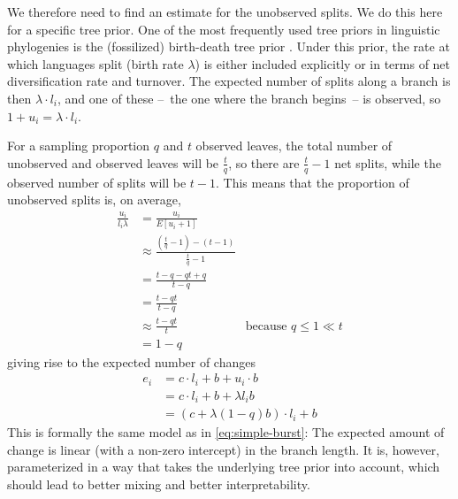 \documentclass[]{rsos}%
\begin{document}
We therefore need to find an estimate for the unobserved splits.
We do this here for a specific tree prior.
One of the most frequently used tree priors in linguistic phylogenies
is the (fossilized) birth-death tree prior \parencite{gernhard2008conditioned,stadler2010samplingthroughtime,heath2014fossilized,rama2018three}.
Under this prior, the rate at which
languages split (birth rate $\lambda$) is either included explicitly or in terms of net diversification rate and turnover.
The expected number of splits along a branch is then $\lambda \cdot l_i$, and one of these –~the one where the branch begins~– is observed, so $1 + u_i = \lambda \cdot l_i$.

For a sampling proportion $q$ and $t$ observed leaves, the total number of unobserved and observed leaves will be
$\frac{t}{q}$, so there are $\frac{t}{q} - 1$ net splits,
while the observed number of splits will be $t - 1$. This means that the proportion of unobserved splits is, on average,
\begin{align}
  \frac{u_i}{l_i \lambda}
  &= \frac{u_i}{E[u_i + 1]} \\
  & \approx \frac{(\frac{t}{q} - 1) - (t - 1)}{\frac{t}{q} -1} \\
  & = \frac{t - q - qt + q}{t - q} \\
  & = \frac{t - qt}{t - q} \\
  & \approx \frac{t - qt}{t} &\text{because } q \leq 1 \ll t \\
  & = 1 - q
\end{align}
giving rise to the expected number of changes
\begin{align}
  e_i &= c \cdot l_i + b + u_i \cdot b  \\
  &= c \cdot l_i + b + \lambda l_i b \\
  &= (c + \lambda (1-q) b) \cdot l_i + b
  \label{eq:reparam-burst}
\end{align}
This is formally the same model as in \cref{eq:simple-burst}: The expected amount of change is linear (with a non-zero intercept) in the branch length. It is, however, parameterized
in a way that takes the underlying tree prior into account,
which should lead to better mixing and better interpretability.
\end{document}
